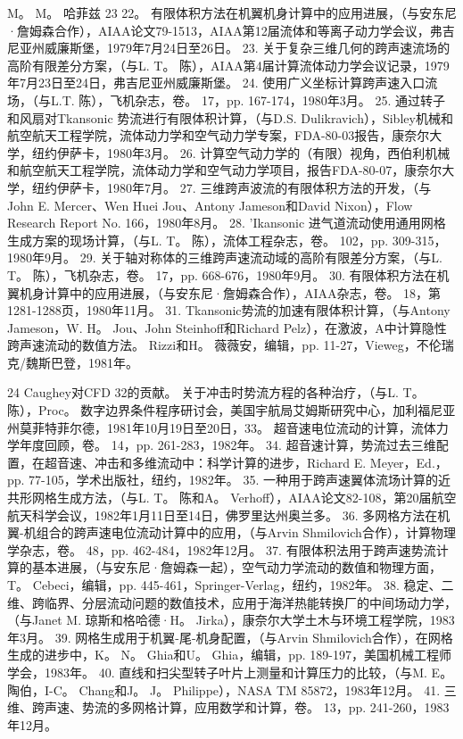 \documentclass[UTF8,11pt,a4paper,openany,fontset=fandol]{ctexbook}
\begin{document}
M。 M。 哈菲兹 23 22。 有限体积方法在机翼机身计算中的应用进展，（与安东尼·詹姆森合作），AIAA论文79-1513，AIAA第12届流体和等离子动力学会议，弗吉尼亚州威廉斯堡，1979年7月24日至26日。 23. 关于复杂三维几何的跨声速流场的高阶有限差分方案，（与L. T。 陈），AIAA第4届计算流体动力学会议记录，1979年7月23日至24日，弗吉尼亚州威廉斯堡。 24. 使用广义坐标计算跨声速入口流场，（与L.T. 陈），飞机杂志，卷。 17，pp. 167-174，1980年3月。 25. 通过转子和风扇对Tkansonic 势流进行有限体积计算，（与D.S. Dulikravich），Sibley机械和航空航天工程学院，流体动力学和空气动力学专案，FDA-80-03报告，康奈尔大学，纽约伊萨卡，1980年3月。 26. 计算空气动力学的（有限）视角，西伯利机械和航空航天工程学院，流体动力学和空气动力学项目，报告FDA-80-07，康奈尔大学，纽约伊萨卡，1980年7月。 27. 三维跨声波流的有限体积方法的开发，（与John E. Mercer、Wen Huei Jou、Antony Jameson和David Nixon），Flow Research Report No. 166，1980年8月。 28. 'Ikansonic 进气道流动使用通用网格生成方案的现场计算，（与L. T。 陈），流体工程杂志，卷。 102，pp. 309-315，1980年9月。 29. 关于轴对称体的三维跨声速流动域的高阶有限差分方案，（与L. T。 陈），飞机杂志，卷。 17，pp. 668-676，1980年9月。 30. 有限体积方法在机翼机身计算中的应用进展，（与安东尼·詹姆森合作），AIAA杂志，卷。 18，第1281-1288页，1980年11月。 31. Tkansonic势流的加速有限体积计算，（与Antony Jameson，W. H。 Jou、John Steinhoff和Richard Pelz），在激波，A中计算隐性跨声速流动的数值方法。 Rizzi和H。 薇薇安，编辑，pp. 11-27，Vieweg，不伦瑞克/魏斯巴登，1981年。

24 Caughey对CFD 32的贡献。 关于冲击时势流方程的各种治疗，（与L. T。 陈），Proc。 数字边界条件程序研讨会，美国宇航局艾姆斯研究中心，加利福尼亚州莫菲特菲尔德，1981年10月19日至20日，33。 超音速电位流动的计算，流体力学年度回顾，卷。 14，pp. 261-283，1982年。 34. 超音速计算，势流过去三维配置，在超音速、冲击和多维流动中：科学计算的进步，Richard E. Meyer，Ed.，pp. 77-105，学术出版社，纽约，1982年。 35. 一种用于跨声速翼体流场计算的近共形网格生成方法，（与L. T。 陈和A。 Verhoff），AIAA论文82-108，第20届航空航天科学会议，1982年1月11日至14日，佛罗里达州奥兰多。 36. 多网格方法在机翼-机组合的跨声速电位流动计算中的应用，（与Arvin Shmilovich合作），计算物理学杂志，卷。 48，pp. 462-484，1982年12月。 37. 有限体积法用于跨声速势流计算的基本进展，（与安东尼·詹姆森一起），空气动力学流动的数值和物理方面，T。 Cebeci，编辑，pp. 445-461，Springer-Verlag，纽约，1982年。 38. 稳定、二维、跨临界、分层流动问题的数值技术，应用于海洋热能转换厂的中间场动力学，（与Janet M. 琼斯和格哈德·H。 Jirka），康奈尔大学土木与环境工程学院，1983年3月。 39. 网格生成用于机翼-尾-机身配置，（与Arvin Shmilovich合作），在网格生成的进步中，K。 N。 Ghia和U。 Ghia，编辑，pp. 189-197，美国机械工程师学会，1983年。 40. 直线和扫尖型转子叶片上测量和计算压力的比较，（与M. E。 陶伯，I-C。 Chang和J。 J。 Philippe），NASA TM 85872，1983年12月。 41. 三维、跨声速、势流的多网格计算，应用数学和计算，卷。 13，pp. 241-260，1983年12月。
\end{document}

